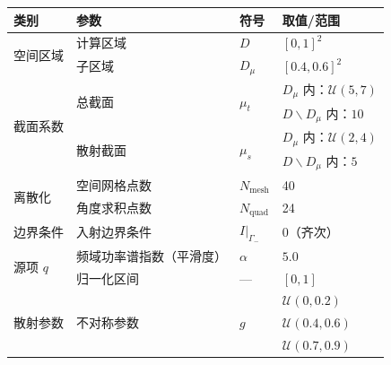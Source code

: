 \begin{table}[!htp]
    \centering
    \begin{tabular}{lp{}ll}
        \toprule
        类别                      & 参数                     & 符号                       & 取值/范围                        \\ \midrule
        \multirow{2}{*}{空间区域}   & 计算区域                   & $D$                      & ${[0,1]}^2$                  \\
                                & 子区域                    & $D_\mu$                  & ${[0.4,0.6]}^2$              \\
        \midrule
        \multirow{4}{*}{截面系数}   & \multirow{2}{*}{总截面}   & \multirow{2}{*}{$\mu_t$} & $D_\mu$ 内：$\mathcal{U}(5,7)$ \\
                                &                        &                          & $D\backslash D_\mu$ 内：$10$   \\
                                & \multirow{2}{*}{散射截面}  & \multirow{2}{*}{$\mu_s$} & $D_\mu$ 内：$\mathcal{U}(2,4)$ \\
                                &                        &                          & $D\backslash D_\mu$ 内：$5$    \\
        \midrule
        \multirow{2}{*}{离散化}    & 空间网格点数                 & $N_{\text{mesh}}$        & 40                           \\
                                & 角度求积点数                 & $N_\text{quad}$          & 24                           \\ \midrule
        \multirow{1}{*}{边界条件}   & 入射边界条件                 & $I\vert_{\Gamma_-}$      & $0$（齐次）                      \\ \midrule
        \multirow{2}{*}{源项 $q$} & 频域功率谱指数（平滑度）           & $\alpha$                 & $5.0$                        \\
                                & 归一化区间                  & ---                      & $[0,1]$                      \\
        \midrule
        \multirow{3}{*}{散射参数}   & \multirow{3}{*}{不对称参数} & \multirow{3}{*}{$g$}     & $\mathcal{U}(0,0.2)$         \\
                                &                        &                          & $\mathcal{U}(0.4,0.6)$       \\
                                &                        &                          & $\mathcal{U}(0.7,0.9)$       \\
        \bottomrule
    \end{tabular}
    \label{tab:dataset_prte}
\end{table}

